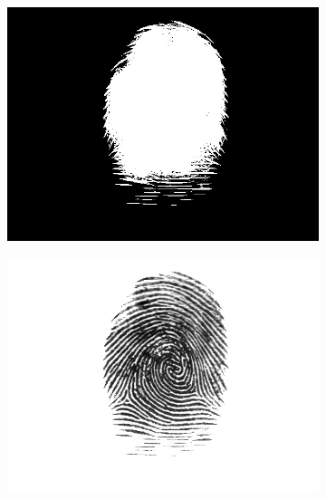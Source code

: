\documentclass{beamer}
\begin{document}
{\begin{figure}[!ht]
\begin{subfigure}[ht]{0.15\textwidth}
            \includegraphics[width=\textwidth]{fingerprints/2004Db1a/1_3_mask.jpg}
        \end{subfigure}
        \qquad
        \begin{subfigure}[ht]{0.15\textwidth}
            \includegraphics[width=\textwidth]{fingerprints/2004Db1a/1_3_filtered.jpg}
        \end{subfigure}
    \end{figure}
}
\end{document}
